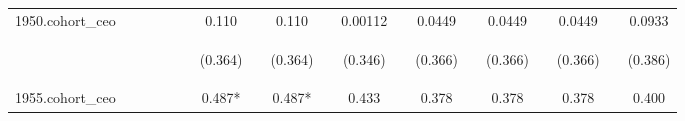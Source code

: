 \begin{center}
\begin{tabular}{lcccccccccccccccccc}
1950.cohort\_ceo &  &  &  &  &  & 0.110 &  & 0.110 &  & 0.00112 &  & 0.0449 &  & 0.0449 &  & 0.0449 &  & 0.0933 \\
\vspace{4pt} & \begin{footnotesize}\end{footnotesize} & \begin{footnotesize}\end{footnotesize} & \begin{footnotesize}\end{footnotesize} & \begin{footnotesize}\end{footnotesize} & \begin{footnotesize}\end{footnotesize} & \begin{footnotesize}(0.364)\end{footnotesize} & \begin{footnotesize}\end{footnotesize} & \begin{footnotesize}(0.364)\end{footnotesize} & \begin{footnotesize}\end{footnotesize} & \begin{footnotesize}(0.346)\end{footnotesize} & \begin{footnotesize}\end{footnotesize} & \begin{footnotesize}(0.366)\end{footnotesize} & \begin{footnotesize}\end{footnotesize} & \begin{footnotesize}(0.366)\end{footnotesize} & \begin{footnotesize}\end{footnotesize} & \begin{footnotesize}(0.366)\end{footnotesize} & \begin{footnotesize}\end{footnotesize} & \begin{footnotesize}(0.386)\end{footnotesize} \\
1955.cohort\_ceo &  &  &  &  &  & 0.487* &  & 0.487* &  & 0.433 &  & 0.378 &  & 0.378 &  & 0.378 &  & 0.400 \\

\end{tabular}
\end{center}
